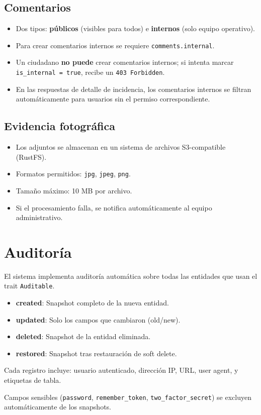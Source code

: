 \documentclass[11pt, a4paper]{article}
\begin{document}
\subsection{Comentarios}

\begin{itemize}
  \item Dos tipos: \textbf{públicos} (visibles para todos) e \textbf{internos} (solo equipo operativo).
  \item Para crear comentarios internos se requiere \texttt{comments.internal}.
  \item Un ciudadano \textbf{no puede} crear comentarios internos; si intenta marcar \texttt{is\_internal = true}, recibe un \texttt{403 Forbidden}.
  \item En las respuestas de detalle de incidencia, los comentarios internos se filtran automáticamente para usuarios sin el permiso correspondiente.
\end{itemize}

\subsection{Evidencia fotográfica}

\begin{itemize}
  \item Los adjuntos se almacenan en un sistema de archivos S3-compatible (RustFS).
  \item Formatos permitidos: \texttt{jpg}, \texttt{jpeg}, \texttt{png}.
  \item Tamaño máximo: 10 MB por archivo.
  \item Si el procesamiento falla, se notifica automáticamente al equipo administrativo.
\end{itemize}


\section{Auditoría}

El sistema implementa auditoría automática sobre todas las entidades que usan el trait \texttt{Auditable}.

\begin{reglanegocio}
\begin{itemize}
  \item \textbf{created}: Snapshot completo de la nueva entidad.
  \item \textbf{updated}: Solo los campos que cambiaron (old/new).
  \item \textbf{deleted}: Snapshot de la entidad eliminada.
  \item \textbf{restored}: Snapshot tras restauración de soft delete.
\end{itemize}
Cada registro incluye: usuario autenticado, dirección IP, URL, user agent, y etiquetas de tabla.

Campos sensibles (\texttt{password}, \texttt{remember\_token}, \texttt{two\_factor\_secret}) se excluyen automáticamente de los snapshots.
\end{reglanegocio}
\end{document}
